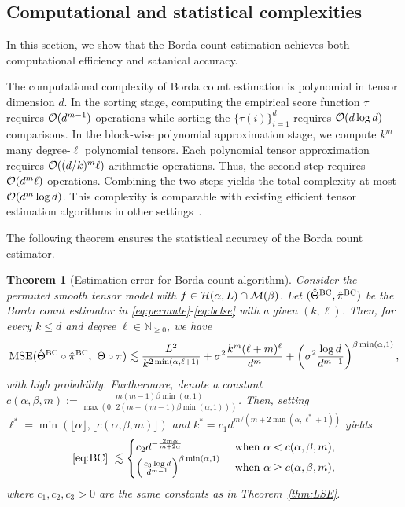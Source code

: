 \documentclass[12pt]{article}
\newtheorem{thm}{Theorem}
\theoremstyle{definition}
\begin{document}
\subsection{Computational and statistical complexities}
In this section, we show that the Borda count estimation achieves both computational efficiency and satanical accuracy. 

The computational complexity of Borda count estimation is polynomial in tensor dimension $d$. In the sorting stage, computing the empirical score function $\tau$ requires $\mathcal{O}(d^{m-1})$ operations while sorting the $\{\tau(i)\}_{i=1}^d$ requires $\mathcal{O}(d\log d)$ comparisons. In the block-wise polynomial approximation stage, we compute $k^m$ many degree-$\ell$ polynomial tensors. Each polynomial tensor approximation requires $\mathcal{O}((d/k)^m\ell)$ arithmetic operations. Thus, the second step requires $\mathcal{O}(d^m\ell)$ operations. Combining the two steps yields the total complexity at most $\mathcal{O}(d^m\log d)$. This complexity is comparable with existing efficient tensor estimation algorithms in other settings~\cite{li2019nearest,zhang2018tensor}.

The following theorem ensures the statistical accuracy of the Borda count estimator.
\begin{thm}[Estimation error for Borda count algorithm]\label{thm:BC} Consider the permuted smooth tensor model with $f\in \mathcal{H}(\alpha,L)\cap \mathcal{M}(\beta)$.
Let $(\hat\Theta^{\textup{BC}},\hat\pi^{\textup{BC}})$ be the Borda count estimator in \eqref{eq:permute}-\eqref{eq:bclse} with a given $(k,\ell)$. Then, for every $k\leq d$ and degree $\ell\in \mathbb{N}_{\geq 0}$, we have
\begin{align}\label{eq:BC}
     \textup{MSE}(\hat\Theta^{\textup{BC}}\circ\hat\pi^{\textup{BC}},\ \Theta\circ\pi)\lesssim  \frac{L^2}{k^{2\min(\alpha,\ell+1)}}+\sigma^2 \frac{k^m(\ell+m)^\ell}{d^m}+ \left(\sigma^2{\log d\over d^{m-1}}\right)^{\beta\min(\alpha,1)},
\end{align}
with high probability. Furthermore, denote a constant $c(\alpha,\beta,m):= \frac{m(m-1)\beta\min(\alpha,1)}{\max(0,\ 2(m-(m-1)\beta\min(\alpha,1)))}$. Then, setting {\footnotesize $
\ell^* = \min\left(\lfloor\alpha\rfloor,\lfloor c(\alpha,\beta,m)\rfloor\right)$} and $k^* = c_1d^{m/ (m+2\min(\alpha,\ell^*+1))}$ yields
\begin{align}\label{eq:rateBC}
  \eqref{eq:BC}\  \lesssim  
   \begin{cases}
   c_2 d^{-{2m\alpha\over m+2\alpha}} & \text{ when } \alpha <c(\alpha,\beta,m),\\
   \left({c_3\log d\over d^{m-1}}\right)^{\beta\min(\alpha,1)}&\text{ when } \alpha \geq c(\alpha,\beta,m),
   \end{cases}
\end{align}
where $c_1,c_2,c_3>0$ are the same constants as in Theorem~\ref{thm:LSE}.
\end{thm}
\end{document}
